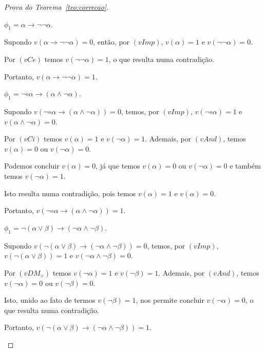 \begin{proof}[Prova do Teorema~\ref{teo:correcao}]
\begin{provaporcasos}
\begin{provaporsubcasos}
                \subcasodeprova{} $\phi_{1} = \alpha \to \neg \neg \alpha$. 
                
                    Supondo $v(\alpha \to \neg \neg \alpha) = 0$, então, por $(vImp)$, $v(\alpha) = 1$ e $v(\neg \neg \alpha) = 0$. 
                    
                    Por $(vCe)$ temos $v(\neg \neg \alpha) = 1$, o que resulta numa contradição. 
                    
                    Portanto, $v(\alpha \to \neg \neg \alpha) = 1$.

                \subcasodeprova{} $\phi_{1} = \neg \circ \alpha \to (\alpha \land \neg \alpha)$. 
                
                    Supondo $v(\neg \circ \alpha \to (\alpha \land \neg \alpha)) = 0$, temos, por $(vImp)$, $v(\neg \circ \alpha) = 1$ e $v(\alpha \land \neg \alpha) = 0$. 
                    
                    Por $(vCi)$ temos $v(\alpha) = 1$ e $v(\neg \alpha) = 1$. Ademais, por $(vAnd)$, temos $v(\alpha) = 0$ ou $v(\neg \alpha) = 0$. 
                    
                    Podemos concluir $v(\alpha) = 0$, já que temos $v(\alpha) = 0$ ou $v(\neg \alpha) = 0$ e também temos $v(\neg \alpha) = 1$. 
                    
                    Isto resulta numa contradição, pois temos $v(\alpha) = 1$ e  $v(\alpha) = 0$. 
                    
                    Portanto, $v(\neg \circ \alpha \to (\alpha \land \neg \alpha)) = 1$.

                \subcasodeprova{} $\phi_{1} = \neg (\alpha \lor \beta) \to (\neg \alpha \land \neg \beta)$. 
                
                    Supondo $v(\neg (\alpha \lor \beta) \to (\neg \alpha \land \neg \beta)) = 0$, temos, por $(vImp)$, $v(\neg (\alpha \lor \beta)) = 1$ e $v(\neg \alpha \land \neg \beta) = 0$. 
                    
                    Por $(vDM_{\lor})$ temos $v(\neg \alpha) = 1$ e $v(\neg \beta) = 1$. Ademais, por $(vAnd)$, temos $v(\neg \alpha) = 0$ ou $v(\neg \beta) = 0$. 
                    
                    Isto, unido ao fato de termos $v(\neg \beta) = 1$, nos permite concluir $v(\neg \alpha) = 0$, o que resulta numa contradição. 
                    
                    Portanto, $v(\neg (\alpha \lor \beta) \to (\neg \alpha \land \neg \beta)) = 1$.



\end{provaporsubcasos}
\end{provaporcasos}
\end{proof}
